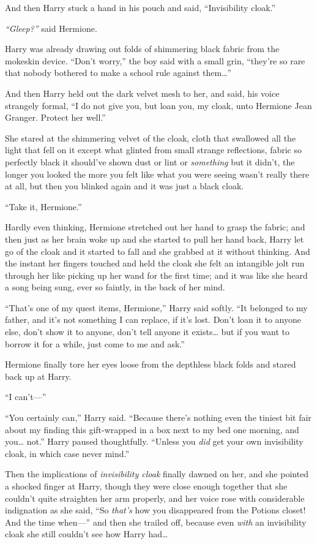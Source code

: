 And then Harry stuck a hand in his pouch and said, ``Invisibility
cloak.''

\emph{``Gleep?''} said Hermione.

Harry was already drawing out folds of shimmering black fabric from the
mokeskin device. ``Don't worry,'' the boy said with a small grin,
``they're so rare that nobody bothered to make a school rule against
them\ldots{}''

And then Harry held out the dark velvet mesh to her, and said, his voice
strangely formal, ``I do not give you, but loan you, my cloak, unto
Hermione Jean Granger. Protect her well.''

She stared at the shimmering velvet of the cloak, cloth that swallowed
all the light that fell on it except what glinted from small strange
reflections, fabric so perfectly black it should've shown dust or lint
or \emph{something} but it didn't, the longer you looked the more you
felt like what you were seeing wasn't really there at all, but then you
blinked again and it was just a black cloak.

``Take it, Hermione.''

Hardly even thinking, Hermione stretched out her hand to grasp the
fabric; and then just as her brain woke up and she started to pull her
hand back, Harry let go of the cloak and it started to fall and she
grabbed at it without thinking. And the instant her fingers touched and
held the cloak she felt an intangible jolt run through her like picking
up her wand for the first time; and it was like she heard a song being
sung, ever so faintly, in the back of her mind.

``That's one of my quest items, Hermione,'' Harry said softly. ``It
belonged to my father, and it's not something I can replace, if it's
lost. Don't loan it to anyone else, don't show it to anyone, don't tell
anyone it exists\ldots{} but if you want to borrow it for a while, just
come to me and ask.''

Hermione finally tore her eyes loose from the depthless black folds and
stared back up at Harry.

``I can't---''

``You certainly can,'' Harry said. ``Because there's nothing even the
tiniest bit fair about my finding this gift-wrapped in a box next to my
bed one morning, and you\ldots{} not.'' Harry paused thoughtfully.
``Unless you \emph{did} get your own invisibility cloak, in which case
never mind.''

Then the implications of \emph{invisibility cloak} finally dawned on
her, and she pointed a shocked finger at Harry, though they were close
enough together that she couldn't quite straighten her arm properly, and
her voice rose with considerable indignation as she said, ``So
\emph{that's} how you disappeared from the Potions closet! And the time
when---'' and then she trailed off, because even \emph{with} an
invisibility cloak she still couldn't see how Harry had\ldots{}

